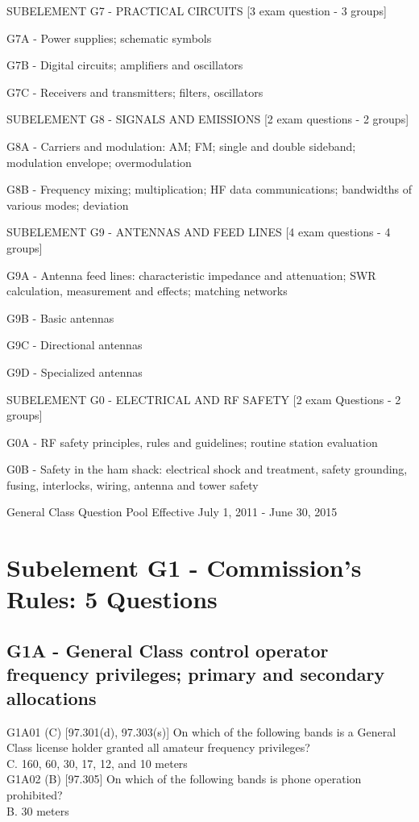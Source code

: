 \documentclass[12pt,letterpaper]{report}
\begin{document}
SUBELEMENT G7 - PRACTICAL CIRCUITS [3 exam question - 3 groups]

G7A - Power supplies; schematic symbols

G7B - Digital circuits; amplifiers and oscillators

G7C - Receivers and transmitters; filters, oscillators

SUBELEMENT G8 - SIGNALS AND EMISSIONS [2 exam questions  - 2 groups]

G8A - Carriers and modulation: AM; FM; single and double sideband; modulation envelope; overmodulation

G8B - Frequency mixing; multiplication; HF data communications; bandwidths of various modes; deviation

SUBELEMENT G9 - ANTENNAS AND FEED LINES [4 exam questions - 4 groups]

G9A - Antenna feed lines: characteristic impedance and attenuation; SWR calculation, measurement and effects; matching networks

G9B - Basic antennas

G9C - Directional antennas

G9D - Specialized antennas

SUBELEMENT G0 - ELECTRICAL AND RF SAFETY [2 exam Questions - 2 groups]

G0A - RF safety principles, rules and guidelines; routine station evaluation

G0B - Safety in the ham shack: electrical shock and treatment, safety grounding, fusing, interlocks, wiring, antenna and tower safety

General Class Question Pool Effective July 1, 2011 - June 30, 2015
\chapter{Subelement G1 - Commission's Rules: 5 Questions}
\section{G1A - General Class control operator frequency privileges; primary and secondary allocations}

G1A01 (C) [97.301(d), 97.303(s)] On which of the following bands is a General Class license holder granted all amateur frequency privileges?\\
C. 160, 60, 30, 17, 12, and 10 meters\\

G1A02 (B) [97.305] On which of the following bands is phone operation prohibited?\\
B. 30 meters\\
\end{document}
